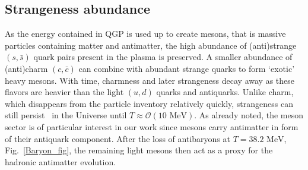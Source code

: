 \documentclass[universe,article,submit,moreauthors,pdftex,a4paper]{Definitions/mdpi}
\newcommand{\MeV}{\text{ MeV}}
\newcommand*{\rf}[1]{Fig.~{\ref{#1}}}
\newcommand*{\xblue}{\color{blue}}
\begin{document}
\subsection{Strangeness abundance}\label{sec:Strangeness}
\noindent As the energy contained in QGP is used up {\xblue to create mesons, that is massive particles containing matter and antimatter}, the high abundance of (anti)strange $(s,\bar{s})$ quark pairs present in the plasma is preserved. A smaller abundance of  (anti)charm $(c,\bar{c})$ can combine with abundant strange quarks to form `exotic' heavy mesons. With time, charmness and later strangeness decay away as these flavors are heavier than the light $(u,d)$ quarks and antiquarks. Unlike charm, which disappears from the particle inventory relatively quickly, strangeness can still persist~\cite{Yang:2021bko} in the Universe until $T\approx\mathcal{O}(10\MeV)$. {\xblue As already noted, the meson sector is of particular interest in our work since mesons carry antimatter in form of their antiquark component. After the loss of  antibaryons at $T=38.2\MeV$, \rf{Baryon_fig}, the remaining light mesons then act as a proxy for the hadronic antimatter evolution.}
\end{document}

